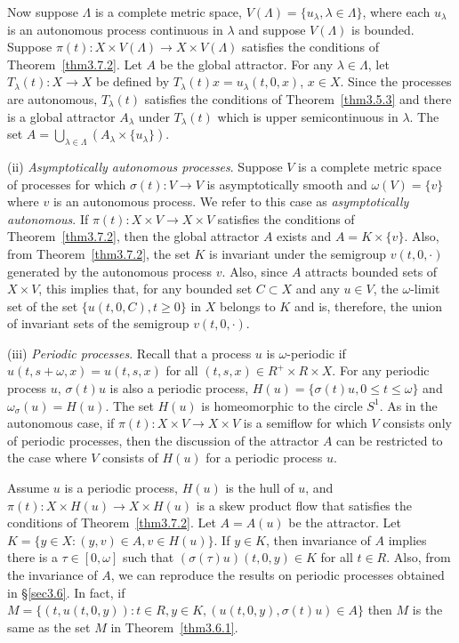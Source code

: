 \documentclass{surv-l}
\theoremstyle{plain}
\theoremstyle{definition}
\numberwithin{equation}{section}
\numberwithin{figure}{chapter}
\begin{document}
Now suppose $\Lambda$ is a complete metric space, $V(\Lambda)=\{u_{\lambda},\lambda \in \Lambda\}$, where each $u_{\lambda}$ is an autonomous process continuous in $\lambda$ and suppose $V(\Lambda)$ is bounded. Suppose $\pi(t)\!:X\times V(\Lambda)\rightarrow X\times V(\Lambda)$ satisfies the conditions of Theorem~\ref{thm3.7.2}. Let $A$ be the global attractor. For any $\lambda\in\Lambda$, let $T_{\lambda}(t)\!:X\rightarrow X$ be defined by $T_{\lambda}(t)x=u_{\lambda}(t, 0, x)$, $x\in X$. Since the processes are autonomous, $T_{\lambda}(t)$ satisfies the conditions of Theorem~\ref{thm3.5.3} and there is a global attractor $A_{\lambda}$ under $T_{\lambda}(t)$ which is upper semicontinuous in $\lambda$. The set $A=\bigcup_{\lambda\in\Lambda}(A_{\lambda}\times\{u_{\lambda}\})$.

(ii) \emph{Asymptotically autonomous processes}. Suppose $V$ is a complete metric space of processes for which $\sigma(t)\!:V\rightarrow V$ is asymptotically smooth and $\omega(V)= \{v\}$ where $v$ is an autonomous process. We refer to this case as \emph{asymptotically autonomous}. If $\pi(t)\!:X\times V\rightarrow X\times V$ satisfies the conditions of Theorem~\ref{thm3.7.2}, then the global attractor $A$ exists and $A=K\times\{v\}$. Also, from Theorem~\ref{thm3.7.2}, the set $K$ is invariant under the semigroup $v(t, 0, \cdot)$ generated by the autonomous process $v$. Also, since $A$ attracts bounded sets of $X\times V$, this implies that, for any bounded set $C\subset X$ and any $u\in V$, the $\omega$-limit set of the set $\{u(t,0,C),t\geq 0\}$ in $X$ belongs to $K$ and is, therefore, the union of invariant sets of the semigroup $v(t,0,\cdot)$.

(iii) \emph{Periodic processes}. Recall that a process $u$ is $\omega$-periodic if $u(t,s+\omega,x)= u(t,s,x)$ for all $(t,s,x)\in R^{+}\times R\times X$. For any periodic process $u,\,\sigma(t)u$ is also a periodic process, $H(u)=\{\sigma(t)u, 0\leq t\leq\omega\}$ and $\omega_{\sigma}(u)=H(u)$. The set $H(u)$ is homeomorphic to the circle $S^{1}$. As in the autonomous case, if $\pi(t)\!:X\times V\rightarrow X\times V$ is a semiflow for which $V$ consists only of periodic processes, then the discussion of the attractor $A$ can be restricted to the case where $V$ consists of $H(u)$ for a periodic process $u$.

Assume $u$ is a periodic process, $H(u)$ is the hull of $u$, and $\pi(t)\!:X\times H(u)\rightarrow X\times H(u)$ is a skew product flow that satisfies the conditions of Theorem~\ref{thm3.7.2}. Let $A=A(u)$ be the attractor. Let $K=\{y\in X\!:(y,v)\in A,v\in H(u)\}$. If $ y\in K$, then invariance of $A$ implies there is a $\tau\in[0,\omega]$ such that $(\sigma(\tau)u)(t, 0, y)\in K$ for all $t\in R$. Also, from the invariance of $A$, we can reproduce the results on periodic processes obtained in \S\ref{sec3.6}. In fact, if $M=\{(t,u(t,0,y))\!:t\in R,y\in K,(u(t,0,y),\sigma(t)u)\in A\}$ then $M$ is the same as the set $M$ in Theorem~\ref{thm3.6.1}.
\end{document}
